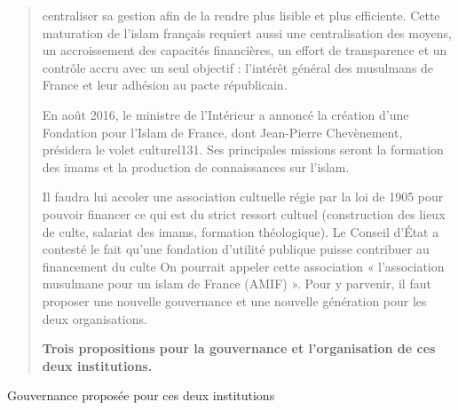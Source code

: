 \begin{quote}
centraliser sa gestion afin de la rendre plus lisible et plus
efficiente. Cette maturation de l'islam français requiert aussi une
centralisation des moyens, un accroissement des capacités financières,
un effort de transparence et un contrôle accru avec un seul objectif :
l'intérêt général des musulmans de France et leur adhésion au pacte
républicain.

En août 2016, le ministre de l'Intérieur a annoncé la création d'une
Fondation pour l'Islam de France, dont Jean-Pierre Chevènement,
présidera le volet culturel131. Ses principales missions seront la
formation des imams et la production de connaissances sur l'islam.

Il faudra lui accoler une association cultuelle régie par la loi de 1905
pour pouvoir financer ce qui est du strict ressort cultuel (construction
des lieux de culte, salariat des imams, formation théologique). Le
Conseil d'État a contesté le fait qu'une fondation d'utilité publique
puisse contribuer au financement du culte On pourrait appeler cette
association « l'association musulmane pour un islam de France (AMIF) ».
Pour y parvenir, il faut proposer une nouvelle gouvernance et une
nouvelle génération pour les deux organisations.

\textbf{Trois propositions pour la gouvernance et l'organisation de ces
deux institutions.}
\end{quote}

Gouvernance proposée pour ces deux institutions


